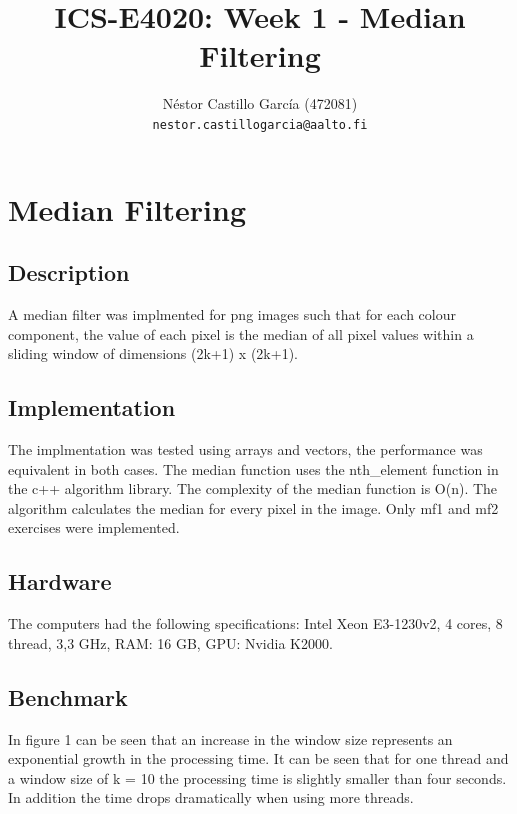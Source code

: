 \documentclass[a4paper,10pt]{article}
\title{ICS-E4020: Week 1 - Median Filtering}
\author{Néstor Castillo García (472081)\\ 
       {\tt nestor.castillogarcia@aalto.fi}}
\begin{document}
\maketitle

\section{Median Filtering}

\subsection{Description}

A median filter was implmented for png images such that for each colour component, the value of each pixel is the median of all pixel values within a sliding window of dimensions (2k+1) x (2k+1).

\subsection{Implementation}
The implmentation was tested using arrays and vectors, the performance was equivalent in both cases. The median function uses the nth\_element function in the c++ algorithm library. The complexity of the median function is O(n). The algorithm calculates the median for every pixel in the image. Only mf1 and mf2 exercises were implemented.


\subsection{Hardware}
The computers had the following specifications: Intel Xeon E3-1230v2, 4 cores, 8 thread, 3,3 GHz, RAM: 16 GB, GPU: Nvidia K2000.

\pagebreak
\subsection{Benchmark}

In figure 1 can be seen that an increase in the window size represents an exponential growth in the processing time. It can be seen that for one thread and a window size of k = 10 the processing time is slightly smaller than four seconds. In addition the time drops dramatically when using more threads.
\end{document}
